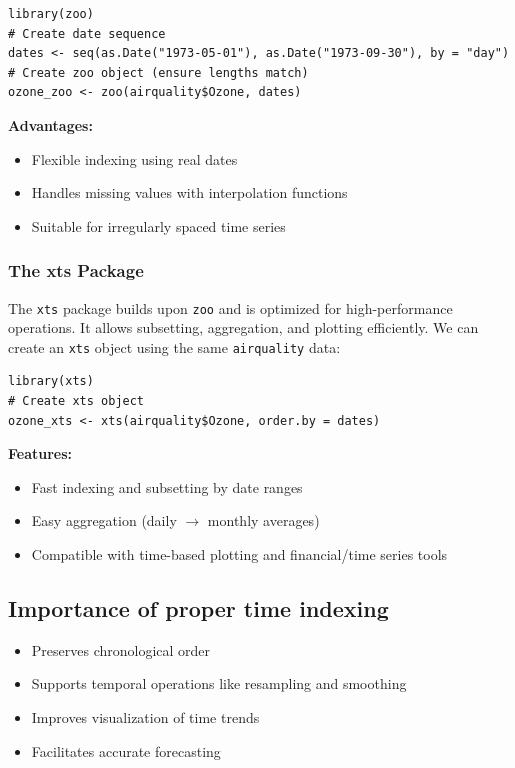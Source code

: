 \documentclass[12pt,a4paper]{article}
\begin{document}
\begin{verbatim}
library(zoo)
# Create date sequence
dates <- seq(as.Date("1973-05-01"), as.Date("1973-09-30"), by = "day")
# Create zoo object (ensure lengths match)
ozone_zoo <- zoo(airquality$Ozone, dates)
\end{verbatim}

\textbf{Advantages:}
\begin{itemize}
    \item Flexible indexing using real dates
    \item Handles missing values with interpolation functions
    \item Suitable for irregularly spaced time series
\end{itemize}

\subsubsection{The xts Package}

The \texttt{xts} package builds upon \texttt{zoo} and is optimized for high-performance operations. It allows subsetting, aggregation, and plotting efficiently. We can create an \texttt{xts} object using the same \texttt{airquality} data:

\begin{verbatim}
library(xts)
# Create xts object
ozone_xts <- xts(airquality$Ozone, order.by = dates)
\end{verbatim}

\textbf{Features:}
\begin{itemize}
    \item Fast indexing and subsetting by date ranges
    \item Easy aggregation (daily $\rightarrow$ monthly averages)
    \item Compatible with time-based plotting and financial/time series tools
\end{itemize}

\subsection{Importance of proper time indexing}

\begin{itemize}
    \item Preserves chronological order
    \item Supports temporal operations like resampling and smoothing
    \item Improves visualization of time trends
    \item Facilitates accurate forecasting
\end{itemize}
\end{document}
